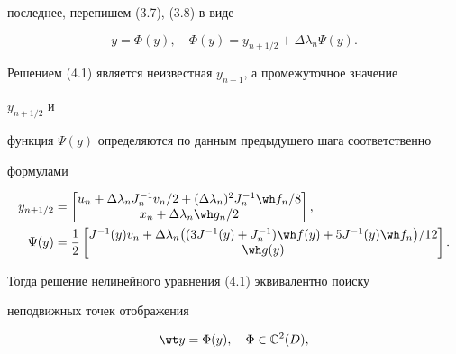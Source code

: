 последнее, перепишем (3.7), (3.8) в виде 


\begin{equation} 


y=\Phi(y),\quad \Phi(y)=y_{n+1/2}+\Delta\lambda_n\Psi(y). 


\end{equation} 


Решением (4.1) является неизвестная $y_{n+1}$, а промежуточное значение 


$y_{n+1/2}$ и 


функция $\Psi(y)$ определяются по данным предыдущего шага соответственно 


формулами 


\begin{equation} 


\begin{split} 


y_{n+1/2}&= 


\begin{bmatrix} 


u_n+\Delta\lambda_n J^{-1}_n v_n/2+(\Delta\lambda_n)^2 


J^{-1}_n\wh f_n/8 \\ x_n+\Delta\lambda_n\wh g_n/2 


\end{bmatrix} 


, \\ 


\Psi(y)&=\frac{1}{2} 


\begin{bmatrix} 


J^{-1}(y)v_n+\Delta\lambda_n\big((3J^{-1}(y)+J^{-1}_n) 


\wh f(y)+5J^{-1}(y)\wh f_n\big)/12 \\ \wh g(y) 


\end{bmatrix} 


. 


\end{split} 


\end{equation} 


Тогда решение нелинейного уравнения (4.1) эквивалентно поиску 


неподвижных точек отображения 


\begin{equation} 


\wt y=\Phi(y),\quad \Phi\in\Bbb C^2(D), 


\end{equation} 


